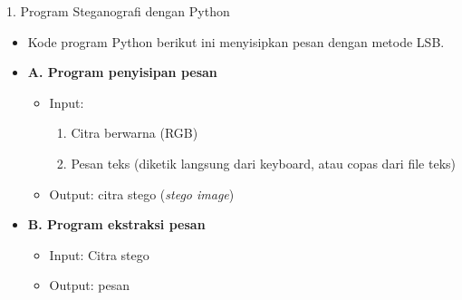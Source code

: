 \documentclass{article}
\begin{document}

1. Program Steganografi dengan Python

\begin{itemize}
    \item Kode program Python berikut ini menyisipkan pesan dengan metode LSB.
    \item \textbf{A. Program penyisipan pesan}
    \begin{itemize}
        \item Input:
        \begin{enumerate}
            \item Citra berwarna (RGB)
            \item Pesan teks (diketik langsung dari keyboard, atau copas dari file teks)
        \end{enumerate}
        \item Output: citra stego (\textit{stego image})
    \end{itemize}
    \item \textbf{B. Program ekstraksi pesan}
    \begin{itemize}
        \item Input: Citra stego
        \item Output: pesan
    \end{itemize}
\end{itemize}
\end{document}
